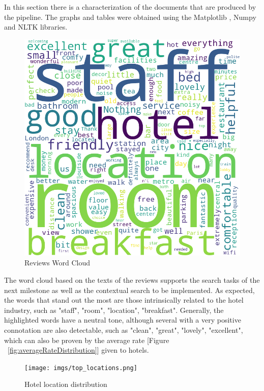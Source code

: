 \documentclass[sigconf]{acmart}
\begin{document}
In this section there is a characterization of the documents that are produced by the pipeline. The graphs and tables were obtained using the Matplotlib \cite{Matplotlib}, Numpy \cite{Numpy} and NLTK \cite{NLTK} libraries.



\begin{figure}[h]
  \centering
  \includegraphics[width=\linewidth]{imgs/reviews_wordcloud.png}
  \caption{Reviews Word Cloud}
  \label{fig:wordcloud}
\end{figure}

The word cloud based on the texts of the reviews supports the search tasks of the next milestone as well as the contextual search to be implemented. As expected, the words that stand out the most are those intrinsically related to the hotel industry, such as "staff", "room", "location", "breakfast". Generally, the highlighted words have a neutral tone, although several with a very positive connotation are also detectable, such as "clean", "great", "lovely", "excellent", which can also be proven by the average rate [Figure ~\ref{fig:averageRateDistribution}] given to hotels.

\begin{figure}[h]
  \centering
  \texttt{[image: imgs/top\_locations.png]}
  \caption{Hotel location distribution}
  \label{fig:hotelLocationDistribution}
\end{figure}
\end{document}
